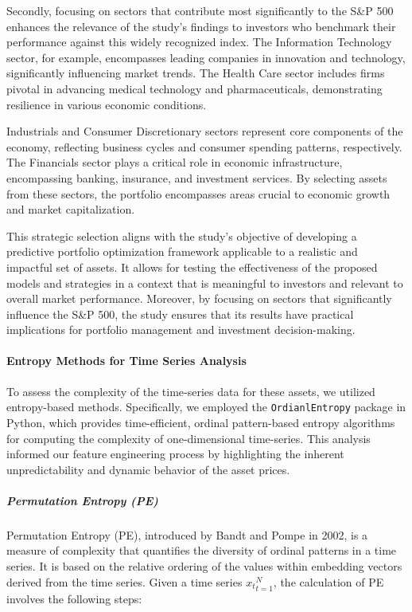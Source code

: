 Secondly, focusing on sectors that contribute most significantly to the S\&P 500 enhances the relevance of the study's findings to investors who benchmark their performance against this widely recognized index. The Information Technology sector, for example, encompasses leading companies in innovation and technology, significantly influencing market trends. The Health Care sector includes firms pivotal in advancing medical technology and pharmaceuticals, demonstrating resilience in various economic conditions.

Industrials and Consumer Discretionary sectors represent core components of the economy, reflecting business cycles and consumer spending patterns, respectively. The Financials sector plays a critical role in economic infrastructure, encompassing banking, insurance, and investment services. By selecting assets from these sectors, the portfolio encompasses areas crucial to economic growth and market capitalization.

This strategic selection aligns with the study's objective of developing a predictive portfolio optimization framework applicable to a realistic and impactful set of assets. It allows for testing the effectiveness of the proposed models and strategies in a context that is meaningful to investors and relevant to overall market performance. Moreover, by focusing on sectors that significantly influence the S\&P 500, the study ensures that its results have practical implications for portfolio management and investment decision-making.

\paragraph{Entropy Methods for Time Series Analysis}
To assess the complexity of the time-series data for these assets, we utilized entropy-based methods. Specifically, we employed the \texttt{OrdianlEntropy} package in Python, which provides time-efficient, ordinal pattern-based entropy algorithms for computing the complexity of one-dimensional time-series. This analysis informed our feature engineering process by highlighting the inherent unpredictability and dynamic behavior of the asset prices.

\subparagraph{Permutation Entropy (PE)}
Permutation Entropy (PE), introduced by Bandt and Pompe in 2002, is a measure of complexity that quantifies the diversity of ordinal patterns in a time series. It is based on the relative ordering of the values within embedding vectors derived from the time series.
Given a time series ${ x_t }_{t=1}^N$, the calculation of PE involves the following steps:

